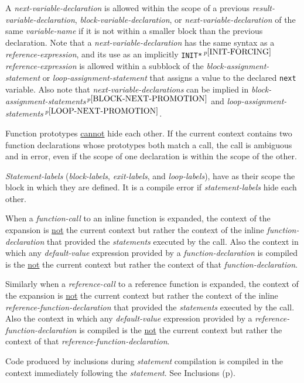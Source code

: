\documentclass[12pt]{article}
\newcommand{\pagref}[1]{p\pageref{#1}}
\newcommand{\pagnote}[1]{$\,^{p\pageref{#1}}$}
\begin{document}
A {\em next-variable-declaration} is allowed
within the scope of a previous {\em result-variable-de\-clar\-a\-tion},
{\em block-variable-declaration},
or {\em next-variable-declaration} of the same {\em variable-name}
if it is not within a smaller block than the previous declaration.
Note that a {\em next-variable-declaration} has
the same syntax as a {\em reference-expression}, and its use
as an implicitly {\tt *INIT*}\pagnote{INIT-FORCING} {\em reference-expression}
is allowed within a subblock of the {\em block-assignment-state\-ment}
or {\em loop-assignment-statement} that assigns a value to the
declared {\tt next} variable.
Also note that {\em next-variable-declarations} can be implied
in {\em block-assignment-statements}\pagnote{BLOCK-NEXT-PROMOTION}
and {\em loop-assignment-statements}\pagnote{LOOP-NEXT-PROMOTION}.

Function prototypes \underline{cannot} hide each other.  If the
current context contains two function declarations whose prototypes
both match a call, the call is ambiguous and in error,
even if the scope of one declaration is within
the scope of the other.

{\em Statement-labels} ({\em block-labels},
{\em exit-labels}, and {\em loop-labels}), have as their scope
the block in which they are defined.  It is a compile
error if {\em statement-labels} hide each other.

When a {\em function-call} to an inline function is expanded,
the context of the expansion is \underline{not} the current context but
rather the context of the inline {\em function-declaration}
that provided the {\em statements} executed by the call.
Also the context in which any {\em default-value} expression
provided by a {\em function-declaration} is compiled\label{DEFAULT-CONTEXT}
is the \underline{not} the current context but
rather the context of that {\em function-declaration}.

Similarly when a {\em reference-call} to a reference function is expanded,
the context of the expansion is \underline{not} the current context but
rather the context of the inline {\em reference-function-declaration}
that provided the {\em statements} executed by the call.
Also the context in which any {\em default-value} expression
provided by a {\em reference-function-declaration}
is compiled is the \underline{not} the current context but
rather the context of that {\em reference-function-declaration}.

Code produced by inclusions during {\em statement} compilation
is compiled in the context immediately following
the {\em statement}.  See Inclusions (\pagref{INCLUSIONS}).
\end{document}
